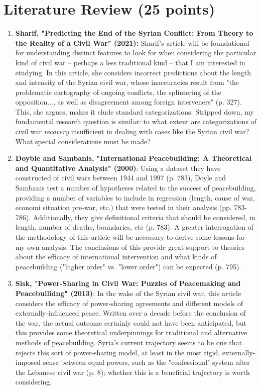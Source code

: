 \documentclass[11pt]{article}
\begin{document}
\section{Literature Review (25 points)}
\begin{enumerate}
    \item \textbf{Sharif, "Predicting the End of the Syrian Conflict: From Theory to the Reality of a Civil War" (2021):} Sharif's article will be foundational for understanding distinct features to look for when considering the particular kind of civil war -- perhaps a less traditional kind -- that I am interested in studying. In this article, she considers incorrect predictions about the length and intensity of the Syrian civil war, whose inaccuracies result from "the problematic cartography of ongoing conflicts, the splintering of the opposition..., as well as disagreement among foreign interveners" (p. 327). This, she argues, makes it elude standard categorizations. Stripped down, my fundamental research question is similar: to what extent are categorizations of civil war \emph{recovery} insufficient in dealing with cases like the Syrian civil war? What special considerations must be made?
    \item \textbf{Doyble and Sambanis, "International Peacebuilding: A Theoretical and Quantitative Analysis" (2000)}: Using a dataset they have constructed of civil wars between 1944 and 1997 (p. 783), Doyle and Sambanis test a number of hypotheses related to the success of peacebuilding, providing a number of variables to include in regression (length, cause of war, economi situation pre-war, etc.) that were tested in their analysis (pp. 783-786). Additionally, they give definitional criteria that should be considered, in length, number of deaths, boundaries, etc (p. 783). A greater interrogation of the methodology of this article will be necessary to derive some lessons for my own analysis. The conclusions of this provide great support to theories about the efficacy of international intervention and what kinds of peacebuilding ("higher order" vs. "lower order") can be expected (p. 795).
    \item \textbf{Sisk, "Power-Sharing in Civil War: Puzzles of Peacemaking and Peacebuilidng" (2013)}: In the wake of the Syrian civil war, this article considers the efficacy of power-sharing agreements and different models of externally-influenced peace. Written over a decade before the conclusion of the war, the actual outcome certainly could not have been anticipated, but this provides some theoretical underpinnings for traditional and alternative methods of peacebuilding. Syria's current trajectory seems to be one that rejects this sort of power-sharing model, at least in the most rigid, externally-imposed sense between equal powers, such as the "confessional" system after the Lebanese civil war (p. 8); whether this is a beneficial trajectory is worth considering.

\end{enumerate}
\end{document}
